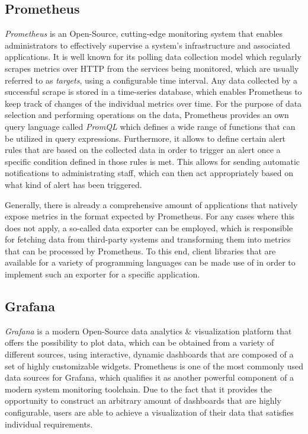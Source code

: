 \subsection{Prometheus}
\textit{Prometheus} is an Open-Source, cutting-edge monitoring system that enables administrators to effectively supervise a system's infrastructure and associated applications. It is well known for its polling data collection model which regularly scrapes metrics over HTTP from the services being monitored, which are usually referred to as \textit{targets}, using a configurable time interval. Any data collected by a successful scrape is stored in a time-series database, which enables Prometheus to keep track of changes of the individual metrics over time. For the purpose of data selection and performing operations on the data, Prometheus provides an own query language called \textit{PromQL} which defines a wide range of functions that can be utilized in query expressions. Furthermore, it allows to define certain alert rules that are based on the collected data in order to trigger an alert once a specific condition defined in those rules is met. This allows for sending automatic notifications to administrating staff, which can then act appropriately based on what kind of alert has been triggered.

Generally, there is already a comprehensive amount of applications that natively expose metrics in the format expected by Prometheus. For any cases where this does not apply, a so-called data exporter can be employed, which is responsible for fetching data from third-party systems and transforming them into metrics that can be processed by Prometheus. To this end, client libraries that are available for a variety of programming languages can be made use of in order to implement such an exporter for a specific application.

\subsection{Grafana}
\textit{Grafana} is a modern Open-Source data analytics \& visualization platform that offers the possibility to plot data, which can be obtained from a variety of different sources, using interactive, dynamic dashboards that are composed of a set of highly customizable widgets. Prometheus is one of the most commonly used data sources for Grafana, which qualifies it as another powerful component of a modern system monitoring toolchain. Due to the fact that it provides the opportunity to construct an arbitrary amount of dashboards that are highly configurable, users are able to achieve a visualization of their data that satisfies individual requirements.

